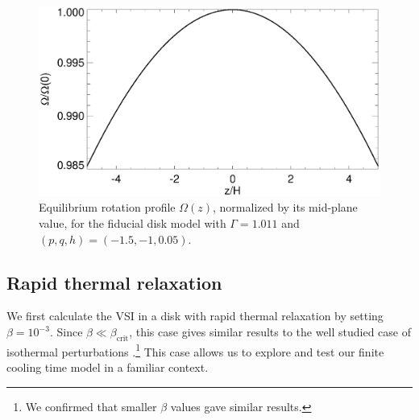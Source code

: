 \begin{figure}
  \includegraphics[width=\linewidth,clip=true,trim=0cm 0cm 0cm
  0cm]{figures/omega2} 
  \caption{Equilibrium rotation profile $\Omega(z)$,
    normalized by its mid-plane value, for  the fiducial disk model with $\Gamma=1.011$
    and $(p,q, h)=(-1.5,-1,0.05)$. 
    \label{omega_z} 
  }
\end{figure}

\subsection{Rapid thermal relaxation}\label{vertiso_pertiso} 
We first calculate the VSI in a disk with rapid thermal relaxation by
setting $\beta=10^{-3}$.  Since $\beta \ll \beta_\mathrm{crit}$, this case
gives similar results to the well studied case of isothermal perturbations
 .\footnote{We confirmed that smaller
 $\beta$ values gave similar results.} This case allows us to explore and test our
finite cooling time model in a familiar context.



